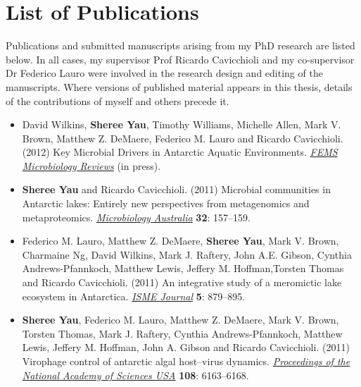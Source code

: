 \chapter*{List of Publications}
Publications and submitted manuscripts arising from my PhD research are listed below.
In all cases, my supervisor Prof Ricardo Cavicchioli and my co-supervisor Dr Federico Lauro were
involved in the research design and editing of the manuscripts.
Where versions of published material appears in this thesis, details of the contributions of 
myself and others precede it.

\begin{itemize}

\item David Wilkins, \textbf{Sheree Yau}, Timothy Williams, Michelle Allen, Mark V. Brown, 
Matthew Z. DeMaere, Federico M. Lauro and Ricardo Cavicchioli. (2012)
Key Microbial Drivers in Antarctic Aquatic Environments.
\textit{\underline{FEMS Microbiology Reviews}}
(in press).

\item \textbf{Sheree Yau} and Ricardo Cavicchioli. (2011) Microbial communities in Antarctic 
lakes: Entirely new perspectives from metagenomics and metaproteomics. 
\textit{\underline{Microbiology Australia}} 
\textbf{32}: 157--159.

\item Federico M. Lauro, Matthew Z. DeMaere, \textbf{Sheree Yau}, Mark V. Brown, Charmaine Ng, 
David Wilkins, Mark J. Raftery, John A.E. Gibson, Cynthia Andrews-Pfannkoch, Matthew Lewis, 
Jeffery M. Hoffman,Torsten Thomas and Ricardo Cavicchioli. (2011)
An integrative study of a meromictic lake ecosystem in Antarctica. 
\textit{\underline{ISME Journal}}
\textbf{5}: 879--895.

\item \textbf{Sheree Yau}, Federico M. Lauro, Matthew Z. DeMaere, Mark V. Brown, Torsten Thomas, 
Mark J. Raftery, Cynthia Andrews-Pfannkoch, Matthew Lewis, Jeffery M. Hoffman, John A. Gibson and 
Ricardo Cavicchioli. (2011)
Virophage control of antarctic algal host--virus dynamics. 
\textit{\underline{Proceedings of the National Academy of Sciences USA}}
\textbf{108}: 6163--6168.

\end{itemize}

